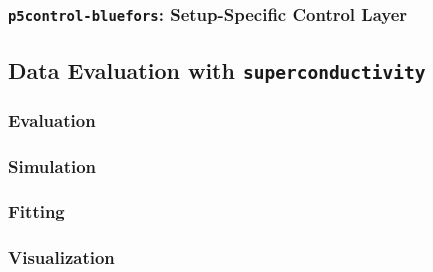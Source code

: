         \newpage
        \subsubsection*{\texttt{p5control-bluefors}: Setup-Specific Control Layer}

    \newpage
    \subsection{Data Evaluation with \texttt{superconductivity}}
    \label{subsec:methods:digital:analysis}

        \newpage
        \subsubsection*{Evaluation}

        \newpage
        \subsubsection*{Simulation}

        \newpage
        \subsubsection*{Fitting}

        \newpage
        \subsubsection*{Visualization}
